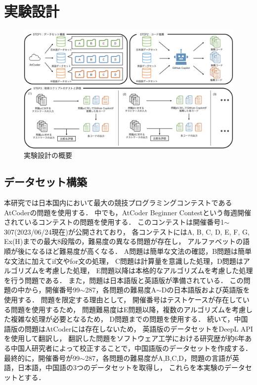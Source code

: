 \section{実験設計\label{approach}}
  \begin{figure}[t]
    \centering
    \includegraphics[width=\linewidth]{image/system.jpg}
    \caption{実験設計の概要}
    \label{experiment_design}
  \end{figure}
  
  \subsection{データセット構築\label{build_dataset}}
    本研究では日本国内において最大の競技プログラミングコンテストであるAtCoder\cite{AtCoder}の問題を使用する．
    中でも，AtCoder Beginner Contestという毎週開催されているコンテストの問題を使用する．
    このコンテストは開催番号1${\sim}$307(2023/06/24現在)が公開されており，
    各コンテストにはA, B, C, D, E, F, G, Ex(H)までの最大8段階の，難易度の異なる問題が存在し，
    アルファベットの語順が後になるほど難易度が高くなる．
    A問題は簡単な文法の確認，B問題は簡単な文法に加えてif文やfor文の処理，
    C問題は計算量を意識した処理，D問題はアルゴリズムを考慮した処理，
    E問題以降は本格的なアルゴリズムを考慮した処理を行う問題である．
    また，問題は日本語版と英語版が準備されている．
    この問題の中から，開催番号99${\sim}$287，各問題の難易度A${\sim}$Dの日本語版および英語版を使用する．
    問題を限定する理由として，
    開催番号はテストケースが存在している問題を使用するため，
    問題難易度はE問題以降，複数のアルゴリズムを考慮した複雑な処理が必要となるため，
    D問題までの問題を使用する．
    続いて，中国語版の問題はAtCoderには存在しないため，
    英語版のデータセットをDeepL APIを使用して翻訳し，
    翻訳した問題をソフトウェア工学における研究歴が約6年ある中国人研究者によって校正することで，中国語版のデータセットを作成する．
    最終的に，開催番号が99${\sim}$287，各問題の難易度がA,B,C,D，問題の言語が英語，日本語，中国語の3つのデータセットを取得し，
    これらを本実験のデータセットとする．

